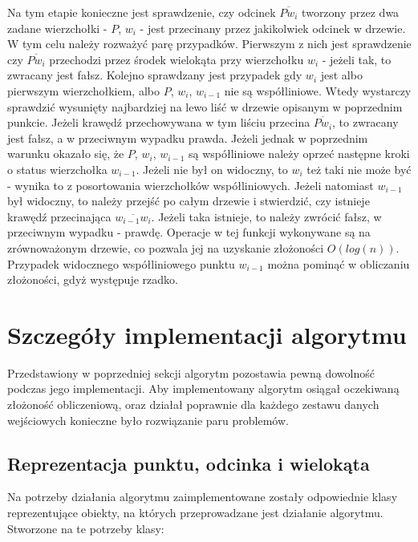 \documentclass{article}
\begin{document}
\noindent \qquad Na tym etapie konieczne jest sprawdzenie, czy odcinek $\overline{Pw_i}$ tworzony przez dwa zadane wierzchołki - $P$, $w_i$ -  jest przecinany przez jakikolwiek odcinek w drzewie. W tym celu należy rozważyć parę przypadków. Pierwszym z nich jest sprawdzenie czy $\overline{Pw_i}$ przechodzi przez środek wielokąta przy wierzchołku $w_i$ - jeżeli tak, to zwracany jest fałsz. Kolejno sprawdzany jest przypadek gdy $w_i$ jest albo pierwszym wierzchołkiem, albo $P$, $w_i$, $w_{i-1}$ nie są współliniowe. Wtedy wystarczy sprawdzić wysunięty najbardziej na lewo liść w drzewie opisanym w poprzednim punkcie. Jeżeli krawędź przechowywana w tym liściu przecina $\overline{Pw_i}$, to zwracany jest fałsz, a w przeciwnym wypadku prawda. Jeżeli jednak w poprzednim warunku okazało się, że $P$, $w_i$, $w_{i-1}$ są współliniowe należy oprzeć następne kroki o status wierzchołka $w_{i-1}$. Jeżeli nie był on widoczny, to $w_{i}$ też taki nie może być - wynika to z posortowania wierzchołków współliniowych. Jeżeli natomiast $w_{i-1}$ był widoczny, to należy przejść po całym drzewie i stwierdzić, czy istnieje krawędź przecinająca $\overline{w_{i-1}w_i}$. Jeżeli taka istnieje, to należy zwrócić fałsz, w przeciwnym wypadku - prawdę. Operacje w tej funkcji wykonywane są na zrównoważonym drzewie, co pozwala jej na uzyskanie złożoności $O(log(n))$. Przypadek widocznego współliniowego punktu $w_{i-1}$ można pominąć w obliczaniu złożoności, gdyż występuje rzadko.

\section{Szczegóły implementacji algorytmu}

\qquad Przedstawiony w poprzedniej sekcji algorytm pozostawia pewną dowolność podczas jego implementacji. Aby implementowany algorytm osiągał oczekiwaną złożoność obliczeniową, oraz działał poprawnie dla każdego zestawu danych wejściowych konieczne było rozwiązanie paru problemów.

\subsection{Reprezentacja punktu, odcinka i wielokąta}

\qquad Na potrzeby działania algorytmu zaimplementowane zostały odpowiednie klasy reprezentujące obiekty, na których przeprowadzane jest działanie algorytmu. Stworzone na te potrzeby klasy:
\end{document}
